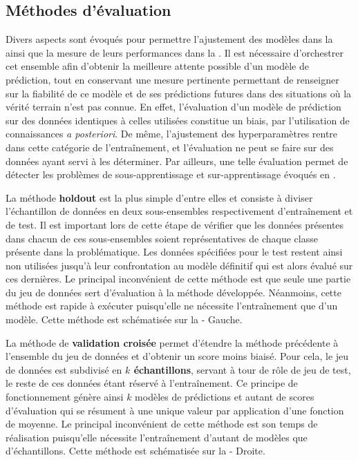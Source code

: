 \subsection{Méthodes d'évaluation}
Divers aspects sont évoqués pour permettre l'ajustement des modèles dans la  ainsi que la mesure de leurs performances dans la . Il est nécessaire d'orchestrer cet ensemble afin d'obtenir la meilleure attente possible d'un modèle de prédiction, tout en conservant une mesure pertinente permettant de renseigner sur la fiabilité de ce modèle et de ses prédictions futures dans des situations où la vérité terrain n'est pas connue. En effet, l'évaluation d'un modèle de prédiction sur des données identiques à celles utilisées constitue un biais, par l'utilisation de connaissances \textit{a posteriori}. De même, l'ajustement des hyperparamètres rentre dans cette catégorie de l'entraînement, et l'évaluation ne peut se faire sur des données ayant servi à les déterminer. Par ailleurs, une telle évaluation permet de détecter les problèmes de sous-apprentissage et sur-apprentissage évoqués en .\par

La méthode \textbf{holdout} est la plus simple d'entre elles et consiste à diviser l’échantillon de données en deux sous-ensembles respectivement d'entraînement et de test. Il est important lors de cette étape de vérifier que les données présentes dans chacun de ces sous-ensembles soient représentatives de chaque classe présente dans la problématique. Les données spécifiées pour le test restent ainsi non utilisées jusqu'à leur confrontation au modèle définitif qui est alors évalué sur ces dernières. Le principal inconvénient de cette méthode est que seule une partie du jeu de données sert d'évaluation à la méthode développée. Néanmoins, cette méthode est rapide à exécuter puisqu'elle ne nécessite l'entraînement que d'un modèle. Cette méthode est schématisée sur la  - Gauche.\par

La méthode de \textbf{validation croisée} permet d'étendre la méthode précédente à l'ensemble du jeu de données et d'obtenir un score moins biaisé. Pour cela, le jeu de données est subdivisé en \textbf{$k$ échantillons}, servant à tour de rôle de jeu de test, le reste de ces données étant réservé à l'entraînement. Ce principe de fonctionnement génère ainsi $k$ modèles de prédictions et autant de scores d'évaluation qui se résument à une unique valeur par application d'une fonction de moyenne. Le principal inconvénient de cette méthode est son temps de réalisation puisqu'elle nécessite l'entraînement d'autant de modèles que d'échantillons. Cette méthode est schématisée sur la  - Droite.\par

